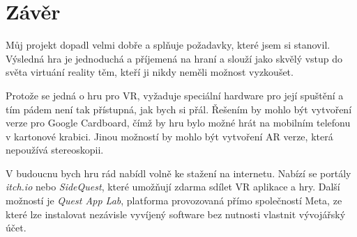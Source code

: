 \chapter*{Závěr}

Můj projekt dopadl velmi dobře a splňuje požadavky, které jsem si stanovil. Výsledná hra je jednoduchá a příjemená na hraní a slouží jako skvělý vstup do světa virtuání reality těm, kteří ji nikdy neměli možnost vyzkoušet.

Protože se jedná o hru pro VR, vyžaduje speciální hardware pro její spuštění a tím pádem není tak přístupná, jak bych si přál. Řešením by mohlo být vytvoření verze pro Google Cardboard, čímž by hru bylo možné hrát na mobilním telefonu v kartonové krabici. Jinou možností by mohlo být vytvoření AR verze, která nepoužívá stereoskopii.

V budoucnu bych hru rád nabídl volně ke stažení na internetu. Nabízí se portály \textit{itch.io} nebo \textit{SideQuest}, které umožňují zdarma sdílet VR aplikace a hry. Další možností je \textit{Quest App Lab}, platforma provozovaná přímo společností Meta, ze které lze instalovat nezávisle vyvíjený software bez nutnosti vlastnit vývojářský účet.

